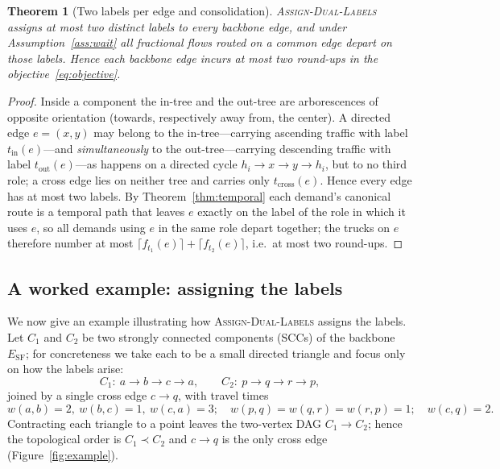 \documentclass[11pt]{article}
\newtheorem{theorem}{Theorem}
\theoremstyle{definition}
\theoremstyle{remark}
\newcommand{\ESF}{E_{\mathrm{SF}}}
\begin{document}
\begin{theorem}[Two labels per edge and consolidation]\label{thm:twolabels}
\textsc{Assign-Dual-Labels} assigns at most two distinct labels to every backbone edge, and under
Assumption~\ref{ass:wait} all fractional flows routed on a common edge depart on those labels. Hence
each backbone edge incurs at most two round-ups in the objective~\eqref{eq:objective}.
\end{theorem}

\begin{proof}
Inside a component the in-tree and the out-tree are arborescences of opposite orientation (towards,
respectively away from, the center). A directed edge $e=(x,y)$ may belong to the in-tree---carrying
ascending traffic with label $t_{\mathrm{in}}(e)$---and \emph{simultaneously} to the out-tree---carrying
descending traffic with label $t_{\mathrm{out}}(e)$---as happens on a directed cycle
$h_i\to x\to y\to h_i$, but to no third role; a cross edge lies on neither tree and carries only
$t_{\mathrm{cross}}(e)$. Hence every edge has at most two labels. By Theorem~\ref{thm:temporal} each
demand's canonical route is a temporal path that leaves $e$ exactly on the label of the role in which
it uses $e$, so all demands using $e$ in the same role depart together; the trucks on $e$ therefore
number at most $\lceil f_{t_1}(e)\rceil+\lceil f_{t_2}(e)\rceil$, i.e.\ at most two round-ups.
\end{proof}

\subsection{A worked example: assigning the labels}\label{sec:example}

We now give an example illustrating how \textsc{Assign-Dual-Labels} assigns the labels. Let $C_1$ and
$C_2$ be two strongly connected components (SCCs) of the backbone $\ESF$; for concreteness we take
each to be a small directed triangle and focus only on how the labels arise:
\[
  C_1:\ a\to b\to c\to a,\qquad C_2:\ p\to q\to r\to p,
\]
joined by a single cross edge $c\to q$, with travel times
\[
  w(a,b)=2,\ w(b,c)=1,\ w(c,a)=3;\quad
  w(p,q)=w(q,r)=w(r,p)=1;\quad w(c,q)=2 .
\]
Contracting each triangle to a point leaves the two-vertex DAG $C_1\to C_2$; hence the topological
order is $C_1\prec C_2$ and $c\to q$ is the only cross edge (Figure~\ref{fig:example}).
\end{document}
